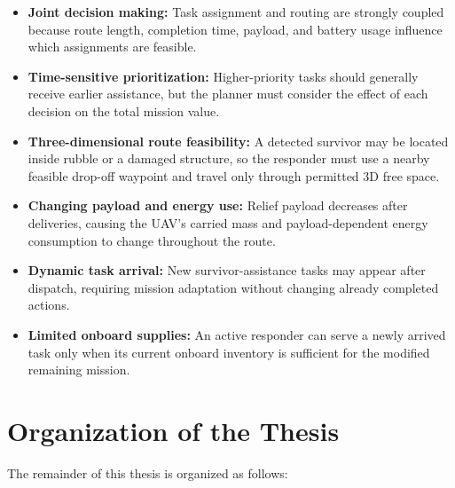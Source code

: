 \begin{itemize}
    \item \textbf{Joint decision making:}
    Task assignment and routing are strongly coupled because route length,
    completion time, payload, and battery usage influence which assignments
    are feasible.

    \item \textbf{Time-sensitive prioritization:}
    Higher-priority tasks should generally receive earlier assistance, but the
    planner must consider the effect of each decision on the total mission
    value.

    \item \textbf{Three-dimensional route feasibility:}
    A detected survivor may be located inside rubble or a damaged structure,
    so the responder must use a nearby feasible drop-off waypoint and travel
    only through permitted 3D free space.

    \item \textbf{Changing payload and energy use:}
    Relief payload decreases after deliveries, causing the UAV's carried mass
    and payload-dependent energy consumption to change throughout the route.

    \item \textbf{Dynamic task arrival:}
    New survivor-assistance tasks may appear after dispatch, requiring mission
    adaptation without changing already completed actions.

    \item \textbf{Limited onboard supplies:}
    An active responder can serve a newly arrived task only when its current
    onboard inventory is sufficient for the modified remaining mission.
\end{itemize}

\section{Organization of the Thesis}

The remainder of this thesis is organized as follows:

